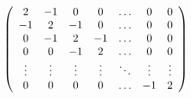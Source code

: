 \[
\left( \begin{array}{c c c c c c c} 2 & - 1 & 0 & 0 & \dots & 0 & 0 \\ - 1 & 2 & - 1 & 0 & \dots & 0 & 0 \\ 0 & - 1 & 2 & - 1 & \dots & 0 & 0 \\ 0 & 0 & - 1 & 2 & \dots & 0 & 0 \\ \vdots & \vdots & \vdots & \vdots & \ddots & \vdots & \vdots \\ 0 & 0 & 0 & 0 & \dots & - 1 & 2 \end{array} \right)
\]

